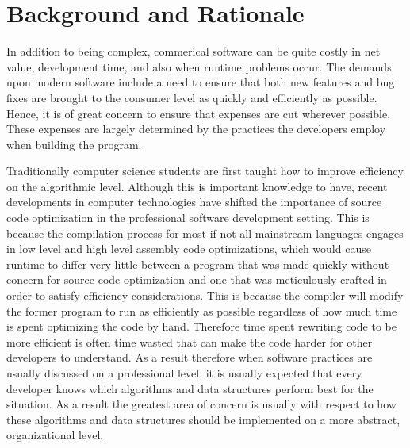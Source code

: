 \documentclass[12pt, letterpaper]{article}
\begin{document}
\section{Background and Rationale}
  In addition to being complex, commerical software can be quite costly in net value, development time, and also when runtime problems occur.
  The demands upon modern software include a need to ensure that both new features and bug fixes are brought to the consumer level as quickly and efficiently as possible. Hence, it is of great
  concern to ensure that expenses are cut wherever possible. These expenses are largely determined by the practices the developers employ when building the program.
  \par Traditionally computer science students are first taught how to improve efficiency on the algorithmic level. Although this is important knowledge to have, recent developments in
  computer technologies have shifted the importance of source code optimization in the professional software development setting. This is because the compilation process for most if not all mainstream
  languages engages in low level and high level assembly code optimizations, which would cause runtime to differ very little between a program that was made quickly without concern for source code
  optimization and one that was meticulously crafted in order to satisfy efficiency considerations. This is because the compiler will modify the former program to run as efficiently as possible regardless of how much time is spent optimizing the code by hand.
  Therefore time spent rewriting code to be more efficient is often time wasted that can make the code harder for other developers to understand. As a result therefore when software practices are usually
  discussed on a professional level, it is usually expected that every developer knows which algorithms and data structures perform best for the situation. As a result the greatest area of concern is
  usually with respect to how these algorithms and data structures should be implemented on a more abstract, organizational level.
\end{document}

